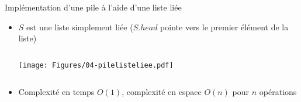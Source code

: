 





\begin{frame}{Implémentation d'une pile à l'aide d'une liste liée}

\begin{itemize}
\item $S$ est une liste simplement liée ($S.head$ pointe vers le premier élément de la liste)

\medskip

\begin{columns}
\begin{column}{5cm}
\begin{center}
\texttt{[image: Figures/04-pilelisteliee.pdf]}
\end{center}

\bigskip

\end{column}
\begin{column}{5cm}
\begin{center}
  \footnotesize
  \hfill

\bigskip

    \end{center}
\end{column}
\end{columns}

\item Complexité en temps $O(1)$, complexité en espace $O(n)$ pour $n$ opérations
\end{itemize}

\end{frame}


